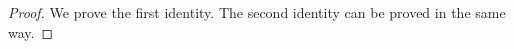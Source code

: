 \documentclass[11pt,reqno]{amsart}
\theoremstyle{definition}
\theoremstyle{remark}
\renewcommand{\(}{\left(}
\renewcommand{\)}{\right)}
\newcommand{\<}{\left<}
\renewcommand{\>}{\right>}
\begin{document}
\begin{proof}
We prove the first identity.
The second identity can be proved in the same way.


\end{proof}
\end{document}
